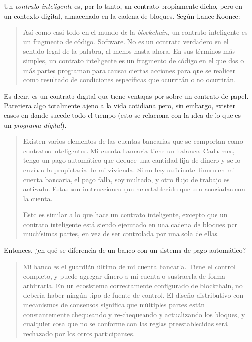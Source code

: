 \documentclass[12pt,a4paper,twoside]{book}
\begin{document}
Un \textit{contrato inteligente} es, por lo tanto, un contrato propiamente dicho, pero en un contexto digital, almacenado en la cadena de bloques. Según Lance Koonce:

\begin{quotation}
Así como casi todo en el mundo de la \textit{blockchain}, un contrato inteligente es un fragmento de código. Software. No es un contrato verdadero en el sentido legal de la palabra, al menos hasta ahora. En sus términos más simples, un contrato inteligente es un fragmento de código en el que dos o más partes programan para causar ciertas acciones para que se realicen como resultado de condiciones específicas que ocurrirán o no ocurrirán. \cite{smartcontract}
\end{quotation} 

Es decir, es un contrato digital que tiene ventajas por sobre un contrato de papel. Pareciera algo totalmente ajeno a la vida cotidiana pero, sin embargo, existen casos en donde sucede todo el tiempo (esto se relaciona con la idea de lo que es un \textit{programa digital}).

\begin{quotation}
Existen varios elementos de las cuentas bancarias que se comportan como contratos inteligentes. Mi cuenta bancaria tiene un balance. Cada mes, tengo un pago automático que deduce una cantidad fija de dinero y se lo envía a la propietaria de mi vivienda. Si no hay suficiente dinero en mi cuenta bancaria, el pago falla, soy multado, y otro flujo de trabajo es activado. Estas son instrucciones que he establecido que son asociadas con la cuenta.

Esto es similar a lo que hace un contrato inteligente, excepto que un contrato inteligente está siendo ejecutado en una cadena de bloques por muchísimas partes, en vez de ser controlada por una sola de ellas. \cite{smartcontract:lewis}
\end{quotation}

Entonces, ¿en qué se diferencia de un banco con un sistema de pago automático?

\begin{quotation}
Mi banco es el guardián último de mi cuenta bancaria. Tiene el control completo, y puede agregar dinero a mi cuenta o sustraerla de forma arbitraria. En un ecosistema correctamente configurado de blockchain, no debería haber ningún tipo de fuente de control. El diseño distributivo con mecanismos de consensos significa que múltiples partes están constantemente chequeando y re-chequeando y actualizando los bloques, y cualquier cosa que no se conforme con las reglas preestablecidas será rechazado por los otros participantes. \cite{smartcontract:lewis}
\end{quotation}
\end{document}

